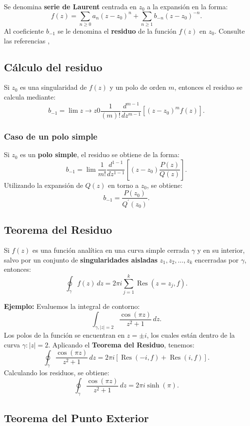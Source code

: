 \documentclass[a4paper,12pt]{article}
\begin{document}
Se denomina \textbf{serie de Laurent} centrada en $z_{0}$ a la expansión en la forma:
\[
f(z) = \sum_{n \geq 0} a_{n} (z - z_{0})^{n} + \sum_{n \geq 1} b_{-n} (z - z_{0})^{-n}.
\]
Al coeficiente $b_{-1}$ se le denomina el \textbf{residuo} de la función $f(z)$ en $z_{0}$. Consulte las referencias \cite{Marsden1987}, \cite{Needham1997}

\subsection{Cálculo del residuo}
Si $z_{0}$ es una singularidad de $f(z)$ y un polo de orden $m$, entonces el residuo se calcula mediante:
\[
b_{-1} = \lim {z \to z{0}} \frac{1}{(m)!} \frac{d^{m-1}}{d z^{m-1}} \left[ (z - z_{0})^m f(z) \right].
\]

\subsubsection*{Caso de un polo simple}
Si $z_{0}$ es un \textbf{polo simple}, el residuo se obtiene de la forma:
\[
b_{-1} = \lim \frac{1}{m!} \frac{d^{1-1}}{d z^{1-1}}\left[\left(z-z_{0}\right) \frac{P(z)}{Q(z)}\right].
\]
Utilizando la expansión de $Q(z)$ en torno a $z_{0}$, se obtiene:
\[
b_{-1} = \frac{P(z_{0})}{Q^{\prime}(z_{0})}.
\]

\subsection{Teorema del Residuo}

Si $f(z)$ es una función analítica en una curva simple cerrada $\gamma$ y en su interior, salvo por un conjunto de \textbf{singularidades aisladas} $z_{1}, z_{2}, \dots, z_{k}$ encerradas por $\gamma$, entonces:
\[
\oint_{\gamma} f(z) \, dz = 2 \pi i \sum_{j=1}^{k} \operatorname{Res}(z = z_{j}, f).
\]

\textbf{Ejemplo:}
Evaluemos la integral de contorno:
\[
\int_{\gamma, |z|=2} \frac{\cos (\pi z)}{z^2 + 1} \, dz.
\]
Los polos de la función se encuentran en $z = \pm i$, los cuales están dentro de la curva $\gamma: |z| = 2$. Aplicando el \textbf{Teorema del Residuo}, tenemos:
\[
\oint_{\gamma} \frac{\cos (\pi z)}{z^2 + 1} \, dz = 2 \pi i \left[ \operatorname{Res}(-i, f) + \operatorname{Res}(i, f) \right].
\]
Calculando los residuos, se obtiene:
\[
\oint_{\gamma} \frac{\cos (\pi z)}{z^2 + 1} \, dz = 2 \pi i \sinh (\pi).
\]

\subsection{Teorema del Punto Exterior}
\end{document}
